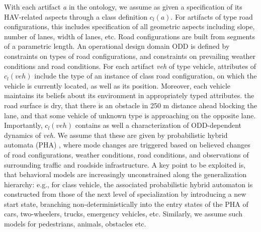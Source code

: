 With each artifact  \emph{a}  in the ontology, we assume as given a specification of its HAV-related aspects through a class definition $c_l(a)$. For artifacts of type road configurations, this includes specification of all geometric aspects including slope, number of lanes, width of lanes, etc. Road configurations are built from segments of a parametric length. An operational design domain ODD is defined by constraints on types of road configurations, and constraints on prevailing weather conditions and road conditions. For each artifact \emph{veh} of type vehicle, attributes of $c_l(veh)$ include the type of an instance of class road configuration, on which the vehicle is currently located, as well as its position. Moreover, each vehicle maintains its beliefs about its environment in appropriately typed attributes.  the road surface is dry, that there is an obstacle in 250 m distance ahead blocking the lane, and that some vehicle of unknown type is approaching on the opposite lane. Importantly, $c_l(veh)$ contains as well a characterization of ODD-dependent dynamics of \emph{veh}. We assume that these are given by probabilistic hybrid automata (PHA) \cite{pha}, where mode changes are triggered based on believed changes of road configurations, weather conditions, road conditions, and observations of surrounding traffic and roadside infrastructure. A key point to be exploited is, that behavioral models are increasingly unconstrained along the generalization hierarchy: e.g., for class vehicle, the associated probabilistic hybrid automaton is constructed from those of the next level of specialization by introducing a new start state, branching non-deterministically into the entry states of the PHA of cars, two-wheelers, trucks, emergency vehicles, etc. Similarly, we assume such models for pedestrians, animals, obstacles etc.
